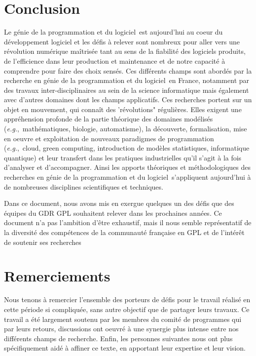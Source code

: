 \documentclass[11pt]{article}
\newcommand{\gpl}[0]{génie de la programmation et du logiciel}
\newcommand{\eg}[0]{\emph{e.g.},~}
\begin{document}
\section{Conclusion}
Le \gpl ~est aujourd'hui au coeur du développement logiciel et les défis à relever sont nombreux pour aller vers une révolution numérique  maîtrisée tant au sens de la fiabilité des logiciels produits, de l'efficience dans leur production et maintenance et de notre capacité à comprendre pour faire des choix sensés. Ces différents champs sont abordés par la recherche en \gpl ~en France, notamment par des travaux inter-disciplinaires au sein de la science informatique mais également avec d'autres domaines dont les champs applicatifs. 
Ces recherches  portent sur un objet en mouvement, qui connaît des 'révolutions" régulières. Elles
exigent une appréhension profonde de la partie théorique des domaines modélisés (\eg mathématiques, biologie, automatisme), la découverte, formalisation, mise en oeuvre et exploitation de nouveaux paradigmes de programmation (\eg  cloud, green computing, introduction de modèles statistiques, informatique quantique) et leur transfert dans les pratiques industrielles qu'il s'agit à la fois d'analyser et d'accompagner. 
Ainsi les apports théoriques et méthodologiques des recherches en \gpl ~s’appliquent aujourd'hui à de nombreuses disciplines scientifiques et techniques.

Dans ce document, nous avons mis en exergue quelques un des défis que des
équipes du GDR GPL souhaitent relever dans les prochaines années. Ce document
n’a pas l’ambition d’être exhaustif, mais il nous semble représentatif de la diversité
des compétences de la communauté française en GPL et de l’intérêt de soutenir ses
recherches



\section*{Remerciements}
Nous tenons à remercier l'ensemble des porteurs de défis pour le travail réalisé en cette période si compliquée, sans autre objectif que de partager leurs travaux. Ce travail a été largement soutenu par les membres du comité de programmes qui par leurs retours, discussions ont oeuvré à une synergie plus intense entre nos différents champs de recherche.
Enfin, les personnes suivantes nous ont plus spécifiquement aidé à affiner ce texte, en apportant leur expertise et leur vision.
\end{document}
